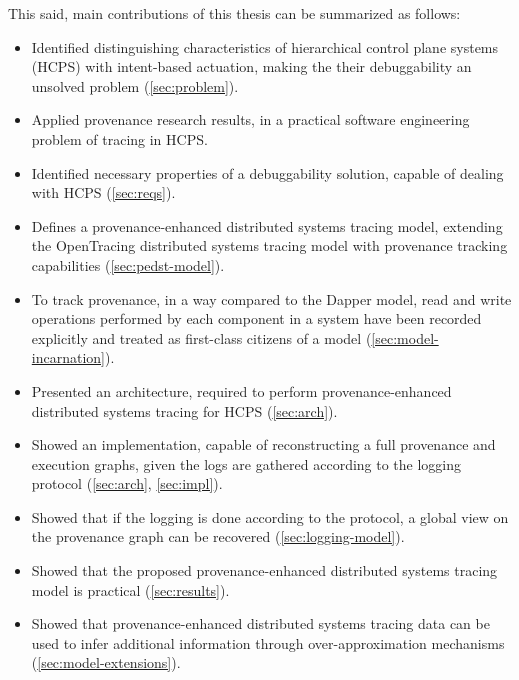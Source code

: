 This said, main contributions of this thesis can be summarized as follows:
%
\begin{itemize}
	\item Identified distinguishing characteristics of hierarchical control plane systems (HCPS) with intent-based actuation, making the their debuggability an unsolved problem (\cref{sec:problem}).
	\item Applied provenance research results, in a practical software engineering problem of tracing in HCPS.
	\item Identified necessary properties of a debuggability solution, capable of dealing with HCPS (\cref{sec:reqs}).
	\item Defines a provenance-enhanced distributed systems tracing model, extending the OpenTracing distributed systems tracing model with provenance tracking capabilities (\cref{sec:pedst-model}).
	\item To track provenance, in a way compared to the Dapper model, read and write operations performed by each component in a system have been recorded explicitly and treated as first-class citizens of a model (\cref{sec:model-incarnation}).
	\item Presented an architecture, required to perform provenance-enhanced distributed systems tracing for HCPS (\cref{sec:arch}).
	\item Showed an implementation, capable of reconstructing a full provenance and execution graphs, given the logs are gathered according to the logging protocol (\cref{sec:arch}, \cref{sec:impl}).
	\item Showed that if the logging is done according to the protocol, a global view on the provenance graph can be recovered (\cref{sec:logging-model}).
	\item Showed that the proposed provenance-enhanced distributed systems tracing model is practical (\cref{sec:results}). 
	\item Showed that provenance-enhanced distributed systems tracing data can be used to infer additional information through over-approximation mechanisms (\cref{sec:model-extensions}).
\end{itemize}


